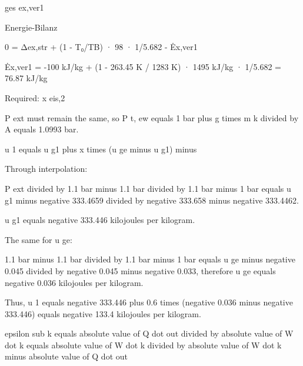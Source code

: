 ges ex,ver1

Energie-Bilanz

0 = Δex,str + (1 - T₀/TB) · 98 · 1/5.682 - Ėx,ver1

Ėx,ver1 = -100 kJ/kg + (1 - 263.45 K / 1283 K) · 1495 kJ/kg · 1/5.682 = 76.87 kJ/kg

Required: x eis,2

P ext must remain the same, so P t, ew equals 1 bar plus g times m k divided by A equals 1.0993 bar.

u 1 equals u g1 plus x times (u ge minus u g1) minus

Through interpolation:

P ext divided by 1.1 bar minus 1.1 bar divided by 1.1 bar minus 1 bar equals u g1 minus negative 333.4659 divided by negative 333.658 minus negative 333.4462.

u g1 equals negative 333.446 kilojoules per kilogram.

The same for u ge:

1.1 bar minus 1.1 bar divided by 1.1 bar minus 1 bar equals u ge minus negative 0.045 divided by negative 0.045 minus negative 0.033, therefore u ge equals negative 0.036 kilojoules per kilogram.

Thus, u 1 equals negative 333.446 plus 0.6 times (negative 0.036 minus negative 333.446) equals negative 133.4 kilojoules per kilogram.

epsilon sub k equals absolute value of Q dot out divided by absolute value of W dot k equals absolute value of W dot k divided by absolute value of W dot k minus absolute value of Q dot out